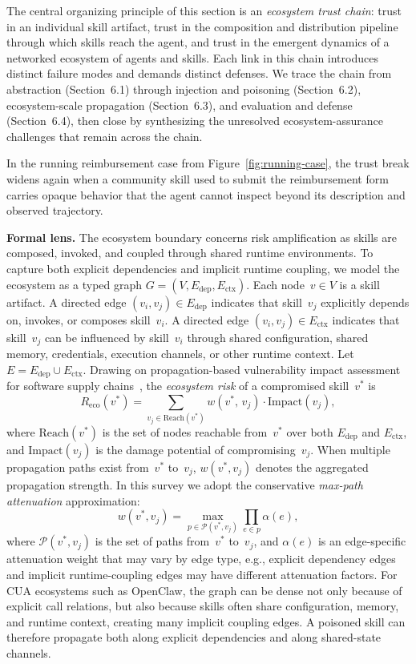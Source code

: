 The central organizing principle of this section is an \emph{ecosystem trust chain}: trust in an individual skill artifact, trust in the composition and distribution pipeline through which skills reach the agent, and trust in the emergent dynamics of a networked ecosystem of agents and skills. Each link in this chain introduces distinct failure modes and demands distinct defenses. We trace the chain from abstraction (Section~6.1) through injection and poisoning (Section~6.2), ecosystem-scale propagation (Section~6.3), and evaluation and defense (Section~6.4), then close by synthesizing the unresolved ecosystem-assurance challenges that remain across the chain.

In the running reimbursement case from Figure~\ref{fig:running-case}, the trust break widens again when a community skill used to submit the reimbursement form carries opaque behavior that the agent cannot inspect beyond its description and observed trajectory.


\noindent\textbf{Formal lens.}
The ecosystem boundary concerns risk amplification as skills are composed, invoked, and coupled through shared runtime environments. To capture both explicit dependencies and implicit runtime coupling, we model the ecosystem as a typed graph $G = (V, E_{\text{dep}}, E_{\text{ctx}})$. Each node~$v \in V$ is a skill artifact. A directed edge $(v_i, v_j) \in E_{\text{dep}}$ indicates that skill~$v_j$ explicitly depends on, invokes, or composes skill~$v_i$. A directed edge $(v_i, v_j) \in E_{\text{ctx}}$ indicates that skill~$v_j$ can be influenced by skill~$v_i$ through shared configuration, shared memory, credentials, execution channels, or other runtime context. Let $E = E_{\text{dep}} \cup E_{\text{ctx}}$. Drawing on propagation-based vulnerability impact assessment for software supply chains~\cite{propagvuln2025}, the \emph{ecosystem risk} of a compromised skill~$v^*$ is
\begin{equation}
  R_{\text{eco}}(v^*) = \sum_{v_j \in \mathrm{Reach}(v^*)} w(v^*,\, v_j) \cdot \mathrm{Impact}(v_j),
  \label{eq:eco-risk}
\end{equation}
where $\mathrm{Reach}(v^*)$ is the set of nodes reachable from~$v^*$ over both $E_{\text{dep}}$ and $E_{\text{ctx}}$, and $\mathrm{Impact}(v_j)$ is the damage potential of compromising~$v_j$. When multiple propagation paths exist from~$v^*$ to~$v_j$, $w(v^*, v_j)$ denotes the aggregated propagation strength. In this survey we adopt the conservative \emph{max-path attenuation} approximation:
\[
  w(v^*, v_j) = \max_{p \in \mathcal{P}(v^*, v_j)} \prod_{e \in p} \alpha(e),
\]
where $\mathcal{P}(v^*, v_j)$ is the set of paths from~$v^*$ to~$v_j$, and $\alpha(e)$ is an edge-specific attenuation weight that may vary by edge type, e.g., explicit dependency edges and implicit runtime-coupling edges may have different attenuation factors. For CUA ecosystems such as OpenClaw, the graph can be dense not only because of explicit call relations, but also because skills often share configuration, memory, and runtime context, creating many implicit coupling edges. A poisoned skill can therefore propagate both along explicit dependencies and along shared-state channels.

